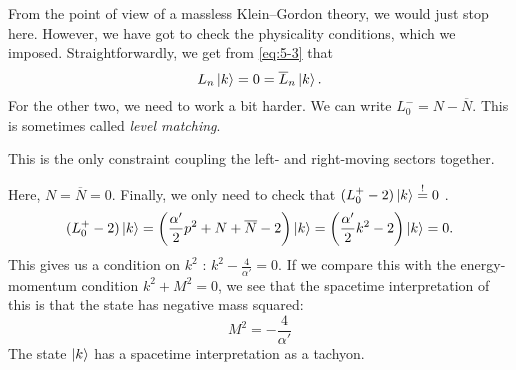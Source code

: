 From the point of view of a massless Klein--Gordon theory, we would just stop here. However, we have got to check the physicality conditions, which we imposed. 
Straightforwardly, we get from \eqref{eq:5-3} that
\begin{equation}
  L_n \ket{k} = 0 = \overline{L}_n \ket{k}.
\end{equation}
For the other two, we need to work a bit harder. We can write $L_0^- = N - \overline{N}$. This is sometimes called \emph{level matching}.
\begin{leftbar}
  This is the only constraint coupling the left- and right-moving sectors together.
\end{leftbar}
Here, $N = \overline{N} = 0$.
Finally, we only need to check that $(L_0^+ - 2) \ket{k} \stackrel{!}{=} 0$ .
\begin{equation}
  \label{eq:5-lp}
  (L_0^+ - 2) \ket{k} = \left( \frac{\alpha'}{2} p^2 + N + \overline{N} - 2 \right) \ket{k} = \left( \frac{\alpha'}{2} k^2 - 2 \right) \ket{k} = 0.
\end{equation}
This gives us a condition on $k^2$ : $k^2 - \frac{4}{\alpha'} = 0$. 
If we compare this with the energy-momentum condition $k^2 + M^2 = 0$, we see that the spacetime interpretation of this is that the state has negative mass squared:
\begin{equation}
  \boxed{M^2 = -\frac{4}{\alpha'}}
\end{equation}
The state $\ket{k}$ has a spacetime interpretation as a tachyon.
